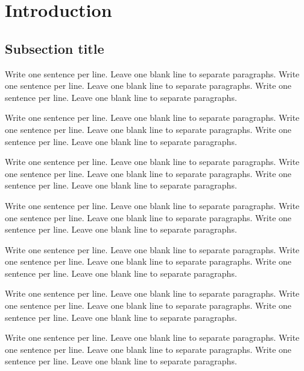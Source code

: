 \documentclass[a4paper, nobind]{templates/ociamthesis}
\begin{document}
\flushbottom




\hypertarget{introduction}{%
\chapter{Introduction}\label{introduction}}

\hypertarget{subsection-title}{%
\section{Subsection title}\label{subsection-title}}

Write one sentence per line.
Leave one blank line to separate paragraphs.
Write one sentence per line.
Leave one blank line to separate paragraphs.
Write one sentence per line.
Leave one blank line to separate paragraphs.

Write one sentence per line.
Leave one blank line to separate paragraphs.
Write one sentence per line.
Leave one blank line to separate paragraphs.
Write one sentence per line.
Leave one blank line to separate paragraphs.

Write one sentence per line.
Leave one blank line to separate paragraphs.
Write one sentence per line.
Leave one blank line to separate paragraphs.
Write one sentence per line.
Leave one blank line to separate paragraphs.

Write one sentence per line.
Leave one blank line to separate paragraphs.
Write one sentence per line.
Leave one blank line to separate paragraphs.
Write one sentence per line.
Leave one blank line to separate paragraphs.

Write one sentence per line.
Leave one blank line to separate paragraphs.
Write one sentence per line.
Leave one blank line to separate paragraphs.
Write one sentence per line.
Leave one blank line to separate paragraphs.

Write one sentence per line.
Leave one blank line to separate paragraphs.
Write one sentence per line.
Leave one blank line to separate paragraphs.
Write one sentence per line.
Leave one blank line to separate paragraphs.

Write one sentence per line.
Leave one blank line to separate paragraphs.
Write one sentence per line.
Leave one blank line to separate paragraphs.
Write one sentence per line.
Leave one blank line to separate paragraphs.
\end{document}
